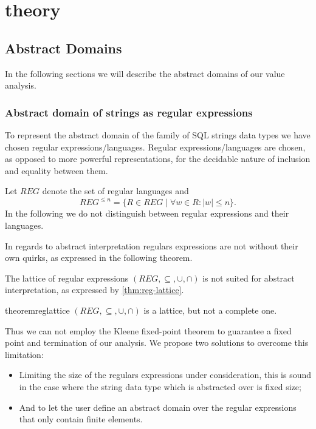 \section{theory}\label{theory}

\subsection{Abstract Domains}\label{subsec:abstract_domains}


In the following sections we will describe the abstract domains of our value analysis.

\subsubsection{Abstract domain of strings as regular expressions}\label{subsubsec:abstract_domains_strings}

To represent the abstract domain of the family of SQL strings data types we have chosen regular expressions/languages.
Regular expressions/languages are chosen, as opposed to more powerful representations, for the decidable nature of inclusion and equality between them.

Let $REG$ denote the set of regular languages and
\begin{equation*}
    REG^{\leq n} = \{R \in REG \mid \forall w \in R : |w| \leq n\}.
\end{equation*}
In the following we do not distinguish between regular expressions and their languages.

In regards to abstract interpretation regulars expressions are not without their own quirks, as expressed in the following theorem.

The lattice of regular expressions $(REG, \subseteq, \cup, \cap)$ is not suited for abstract interpretation, as expressed by \autoref{thm:reg-lattice}.

\begin{restatable}{theorem}{reglattice}\label{thm:reg-lattice}
    $(REG, \subseteq, \cup, \cap)$ is a lattice, but not a complete one.
\end{restatable}

Thus we can not employ the Kleene fixed-point theorem to guarantee a fixed point and termination of our analysis.
We propose two solutions to overcome this limitation:
\begin{itemize}
    \item Limiting the size of the regulars expressions under consideration, this is sound in the case where the string data type which is abstracted over is fixed size;
    \item And to let the user define an abstract domain over the regular expressions that only contain finite elements.
\end{itemize}

